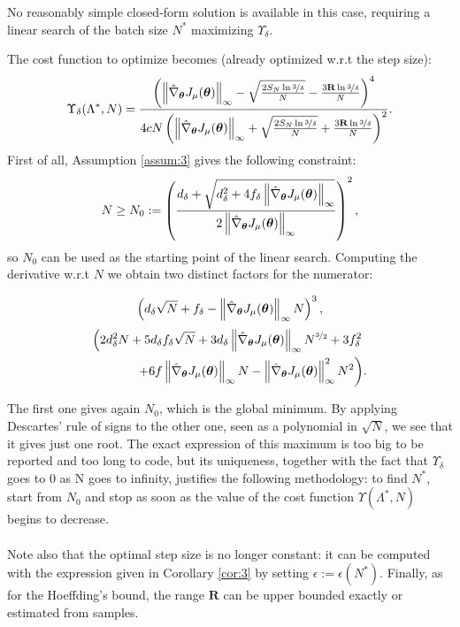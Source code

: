 No reasonably simple closed-form solution is available in this case, requiring a linear search of the batch size $N^*$ maximizing $\Upsilon_\delta$. 

The cost function to optimize becomes (already optimized w.r.t the step size):
\[
\Upsilon_{\delta}(\Lambda^*,N) = \frac{\left(\norm[\infty]{\gradApp{\vtheta}} - 
		\sqrt{\frac{2S_N\ln{\nicefrac{3}{\delta}}}{N}} - \frac{3\mathbf{R}\ln{\nicefrac{3}{\delta}}}{N}\right)^4}
		{4cN
		\left(\norm[\infty]{\gradApp{\vtheta}} + 
				\sqrt{\frac{2S_N\ln{\nicefrac{3}{\delta}}}{N}} + \frac{3\mathbf{R}\ln{\nicefrac{3}{\delta}}}{N}\right)^2}.
\]
First of all, Assumption \ref{assum:3} gives the following constraint:
\[
N \geq N_0 := \left(\frac{d_{\delta} + \sqrt{d_{\delta}^2 + 4f_{\delta}\norm[\infty]{\gradApp{\vtheta}}}}
{2\norm[\infty]{\gradApp{\vtheta}}}
\right)^2,
\]
so $N_0$ can be used as the starting point of the linear search.
Computing the derivative w.r.t $N$ we obtain two distinct factors for the numerator:

\begin{align*}
\left(d_{\delta}\sqrt{N}+f_{\delta} - \norm[\infty]{\gradApp{\vtheta}}N\right)^3,
\end{align*}
\begin{align*}
\left(2d_{\delta}^2N+5d_{\delta}f_{\delta}\sqrt{N}+3d_{\delta}\norm[\infty]{\gradApp{\vtheta}}N^{\nicefrac{3}{2}} +3f_{\delta}^2\right.& \\
\left.   \hspace*{1cm}+6f\norm[\infty]{\gradApp{\vtheta}}N-\norm[\infty]{\gradApp{\vtheta}}^2N^2\right)&.
\end{align*}

The first one gives again $N_0$, which is the global minimum. By applying Descartes' rule of signs to the other one, seen as a polynomial in $\sqrt{N}$, we see that it gives just one root. The exact expression of this maximum is too big to be reported and too long to code, but its uniqueness, together with the fact that $\Upsilon_{\delta}$ goes to $0$ as N goes to infinity, justifies the following methodology: to find $N^*$, start from $N_0$ and stop as soon as the value of the cost function $\Upsilon(\Lambda^*,N)$ begins to decrease.
\paragraph{}
Note also that the optimal step size is no longer constant: it can be computed with the expression given in Corollary \ref{cor:3} by setting $\epsilon := \epsilon(N^*)$.
Finally, as for the Hoeffding's bound, the range $\mathbf{R}$ can be upper bounded exactly or estimated from samples.

